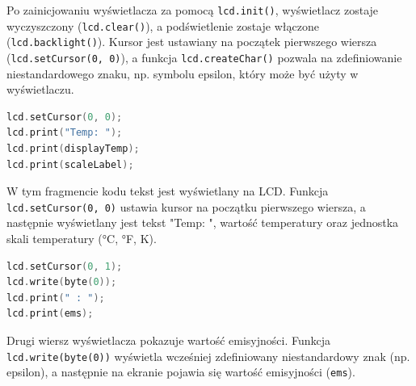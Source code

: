 Po zainicjowaniu wyświetlacza za pomocą \texttt{lcd.init()}, wyświetlacz zostaje wyczyszczony (\texttt{lcd.clear()}), a podświetlenie zostaje włączone (\texttt{lcd.backlight()}). Kursor jest ustawiany na początek pierwszego wiersza (\texttt{lcd.setCursor(0, 0)}), a funkcja \texttt{lcd.createChar()} pozwala na zdefiniowanie niestandardowego znaku, np. symbolu epsilon, który może być użyty w wyświetlaczu.

\begin{lstlisting}[language=C++]
lcd.setCursor(0, 0);
lcd.print("Temp: ");
lcd.print(displayTemp);
lcd.print(scaleLabel);
\end{lstlisting}

W tym fragmencie kodu tekst jest wyświetlany na LCD. Funkcja \texttt{lcd.setCursor(0, 0)} ustawia kursor na początku pierwszego wiersza, a następnie wyświetlany jest tekst "Temp: ", wartość temperatury oraz jednostka skali temperatury (°C, °F, K).

\begin{lstlisting}[language=C++]
lcd.setCursor(0, 1);
lcd.write(byte(0));
lcd.print(" : ");
lcd.print(ems);
\end{lstlisting}

Drugi wiersz wyświetlacza pokazuje wartość emisyjności. Funkcja \texttt{lcd.write(byte(0))} wyświetla wcześniej zdefiniowany niestandardowy znak (np. epsilon), a następnie na ekranie pojawia się wartość emisyjności (\texttt{ems}).


